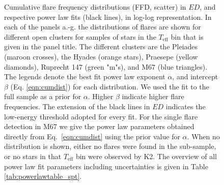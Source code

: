\documentclass{aa}
\begin{document}
\begin{figure}[Ht!]
    \caption{Cumulative flare frequency distributions (FFD, scatter) in $ED$, and respective power law fits (black lines), in log-log representation. In each of the panels a.-g. the distributions of flares are shown for different open clusters for samples of stars in the $T_\mathrm{eff}$ bin that is given in the panel title. The different clusters are the Pleiades (maroon crosses), the Hyades (orange stars), Praesepe (yellow diamonds), Ruprecht 147 (green "m"s), and M67 (blue triangles). The legends denote the best fit power law exponent $\alpha$, and intercept $\beta$ (Eq. \ref{eqn:cumdist}) for each distribution. We used the fit to the full sample as a prior for $\alpha$. Higher $\beta$ indicate higher flare frequencies. The extension of the black lines in $ED$ indicates the low-energy threshold adopted for every fit. For the single flare detection in M67 we give the power law parameters obtained directly from Eq.~\ref{eqn:cumdist} using the prior value for $\alpha$. When no distribution is shown, either no flares were found in the sub-sample, or no stars in that $T_\mathrm{eff}$ bin were observed by K2. The overview of all power law fit parameters including uncertainties is given in Table \ref{tab:powerlawtable_spt}.}       	
    \label{fig:powerlawfits_s}
\end{figure}
\end{document}
